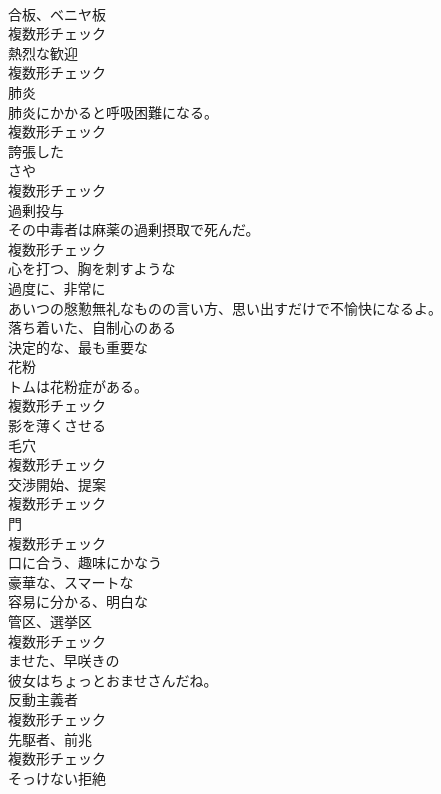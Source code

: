 \documentclass[8pt]{extreport}
\begin{document}
\begin{CJK}{UTF8}{min}
\\	[名詞]	合板、ベニヤ板	
\\	複数形チェック
\\	[名詞]	熱烈な歓迎	
\\	複数形チェック
\\	[名詞]	肺炎	
\\	肺炎にかかると呼吸困難になる。	
\\	複数形チェック
\\	[形容詞]	誇張した	
\\	[名詞]	さや	
\\	複数形チェック
\\	[名詞]	過剰投与	
\\	その中毒者は麻薬の過剰摂取で死んだ。	
\\	複数形チェック
\\	[形容詞]	心を打つ、胸を刺すような	
\\	[副詞]	過度に、非常に	
\\	あいつの慇懃無礼なものの言い方、思い出すだけで不愉快になるよ。	
\\	[形容詞]	落ち着いた、自制心のある	
\\	[形容詞]	決定的な、最も重要な	
\\	[名詞]	花粉	
\\	トムは花粉症がある。	
\\	複数形チェック
\\	[動詞]	影を薄くさせる	
\\	[名詞]	毛穴	
\\	複数形チェック
\\	[名詞]	交渉開始、提案	
\\	複数形チェック
\\	[名詞]	門	
\\	複数形チェック
\\	[形容詞]	口に合う、趣味にかなう	
\\	[形容詞]	豪華な、スマートな	
\\	[形容詞]	容易に分かる、明白な	
\\	[名詞]	管区、選挙区	
\\	複数形チェック
\\	[形容詞]	ませた、早咲きの	
\\	彼女はちょっとおませさんだね。	
\\	[名詞]	反動主義者	
\\	複数形チェック
\\	[名詞]	先駆者、前兆	
\\	複数形チェック
\\	[名詞]	そっけない拒絶	

\end{CJK}
\end{document}
